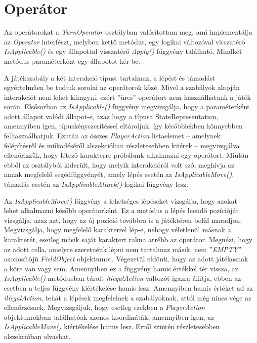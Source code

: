 \documentclass[
]{thesis-ekf}
\theoremstyle{definition}
\theoremstyle{remark}
\begin{document}
\section{Operátor} \label{operator}

Az operátorokat a \emph{TurnOperator} osztályban valósítottam meg, ami implementálja az \emph{Operator} interfészt, melyben kettő metódus, egy logikai változóval visszatérő \emph{IsApplicable()} és egy állapottal visszatérő \emph{Apply()} függvény található. Mindkét metódus paraméterként egy állapotot kér be.

A játékszabály a két interakció típust tartalmaz, a lépést és támadást egyértelműen be tudjuk sorolni az operátorok közé. Mivel a szabályok alapján interakciót nem lehet kihagyni, ezért ''üres'' operátort nem használhatunk a játék során. Elsősorban az \emph{IsApplicable()} függvény megvizsgálja, hogy a paraméterként adott állapot valódi állapot-e, azaz hogy a típusa StateRepresentation, amennyiben igen, típuskényszerítéssel eltároljuk, így későbbiekben könnyebben felhasználhatjuk. Ezután az összes \emph{PlayerAction} listaelemet -- amelynek felépítésről és működéséről  alszekcióban részletesebben kitérek -- megvizsgálva ellenőrizzük, hogy létező karakterre próbálunk alkalmazni egy operátort. Miután ebből az osztályból kiderült, hogy melyik interakcióról volt szó, meghívja az annak megfelelő segédfüggvényét, amely lépés esetén az \emph{IsApplicableMove()}, támadás esetén az \emph{IsApplicableAttack()} logikai függvény lesz.

Az \emph{IsApplicableMove()} függvény a lehetséges lépéseket vizsgálja, hogy azokat lehet alkalmazni később operátorként. Ez a metódus a lépés leendő pozícióját vizsgálja, azaz azt, hogy az új pozíció továbbra is a játéktéren belül maradjon. Megvizsgálja, hogy megfelelő karakterrel lép-e, nehogy véletlenül másnak a karakterét, esetleg másik saját karaktert rakna arrébb az operátor. Megnézi, hogy az adott cella, amelyre szeretnénk lépni nem tartalmaz másik, nem ''\emph{EMPTY}'' azonosítójú \emph{FieldObject} objektumot. Végezetül eldönti, hogy az adott játékosnak a köre van vagy sem. Amennyiben ez a függvény hamis értékkel tér vissza, az \emph{IsApplicable()} metódusban tárolt \emph{illegalAction} változót igazra állítja, ebben az esetben a teljes függvény kiértékelése hamis lesz. Amennyiben hamis értéket ad az \emph{illegalAction}, tehát a lépések megfelelnek a szabályoknak, attól még nincs vége az ellenőrzésnek. Megvizsgáljuk, hogy esetleg ezekben a \emph{PlayerAction} objektumokban találhatóak azonos koordináták, amennyiben igen, az \emph{IsApplicableMove()} kiértékelése hamis lesz. Erről szintén részletesebben  alszekcióban olvashat.
\end{document}
